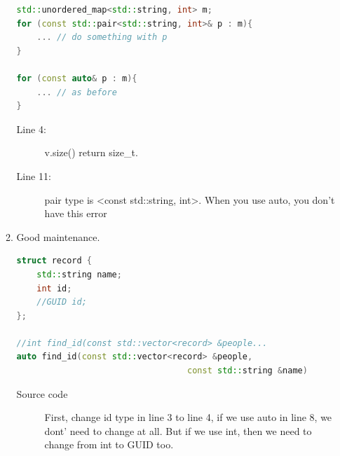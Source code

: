 \documentclass[a4paper,11pt,twoside]{book}
\begin{document}
\begin{itemize}
\begin{enumerate}
\begin{lstlisting}[frame=single, language=c++]
std::unordered_map<std::string, int> m;
for (const std::pair<std::string, int>& p : m){
	... // do something with p
}

for (const auto& p : m){
	... // as before
}
\end{lstlisting}
\begin{description}
	\item[Line 4:] v.size() return size\_t.
	\item[Line 11:] pair type is <const std::string, int>. When you use auto, you don't have this error
\end{description}
	\item Good maintenance.
\begin{lstlisting}[frame=single, language=c++, mathescape=true]
struct record {
	std::string name;
	int id;
	//GUID id; 
};

//int find_id(const std::vector<record> &people...
auto find_id(const std::vector<record> &people, 
                                  const std::string &name)
\end{lstlisting}
\begin{description}
	\item[Source code] First, change id type in line 3 to line 4, if we use auto in line 8, we dont' need to change at all. But if we use int, then we need to change from int to GUID too.
\end{description}

	\end{enumerate}
\end{itemize}
	
\end{document}
